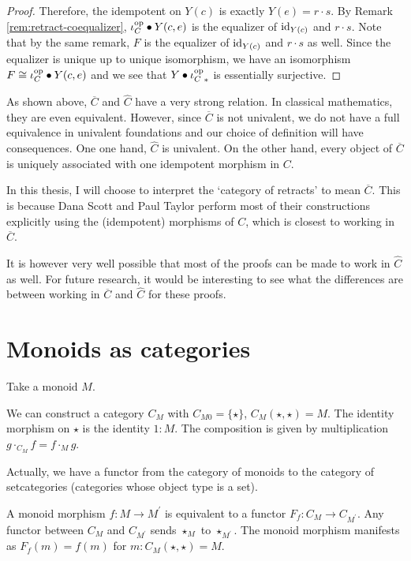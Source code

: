 \begin{proof}
  Therefore, the idempotent on $ Y(c) $ is exactly $ Y(e) = r \cdot s $. By Remark \ref{rem:retract-coequalizer}, $ \iota_C^{\text{op}} \bullet Y(c, e) $ is the equalizer of $ \text{id}_{Y(c)} $ and $ r \cdot s $. Note that by the same remark, $ F $ is the equalizer of $ \text{id}_{Y(c)} $ and $ r \cdot s $ as well. Since the equalizer is unique up to unique isomorphism, we have an isomorphism $ F \cong \iota_C^{\text{op}} \bullet Y(c, e) $ and we see that $ Y \bullet {\ensuremath{\iota_C^{\text{op}}}}_* $ is essentially surjective.
\end{proof}

\begin{remark}
  As shown above, $ \overline C $ and $ \hat C $ have a very strong relation. In classical mathematics, they are even equivalent. However, since $ \overline C $ is not univalent, we do not have a full equivalence in univalent foundations and our choice of definition will have consequences. One one hand, $ \hat C $ is univalent. On the other hand, every object of $ \overline C $ is uniquely associated with one idempotent morphism in $ C $.

  In this thesis, I will choose to interpret the `category of retracts' to mean $ \overline C $. This is because Dana Scott and Paul Taylor perform most of their constructions explicitly using the (idempotent) morphisms of $ C $, which is closest to working in $ \overline C $.

  It is however very well possible that most of the proofs can be made to work in $ \hat C $ as well. For future research, it would be interesting to see what the differences are between working in $ \overline C $ and $ \hat C $ for these proofs.
\end{remark}

\section{Monoids as categories}\label{sec:monoid-category}
Take a monoid $ M $.
\begin{definition}
  We can construct a category $ C_M $ with $ C_{M0} = \{ \star \} $, $ C_M(\star, \star) = M $. The identity morphism on $ \star $ is the identity $ 1: M $. The composition is given by multiplication $ g \cdot_{C_M} f = f \cdot_M g $.
\end{definition}

\begin{remark}
  Actually, we have a functor from the category of monoids to the category of setcategories (categories whose object type is a set).

  A monoid morphism $ f: M \to M^\prime $ is equivalent to a functor $ F_f: C_M \to C_{M^\prime} $. Any functor between $ C_M $ and $ C_{M^\prime} $ sends $ \star_M $ to $ \star_{M^\prime} $. The monoid morphism manifests as $ F_f(m) = f(m) $ for $ m: C_M(\star, \star) = M $.
\end{remark}

